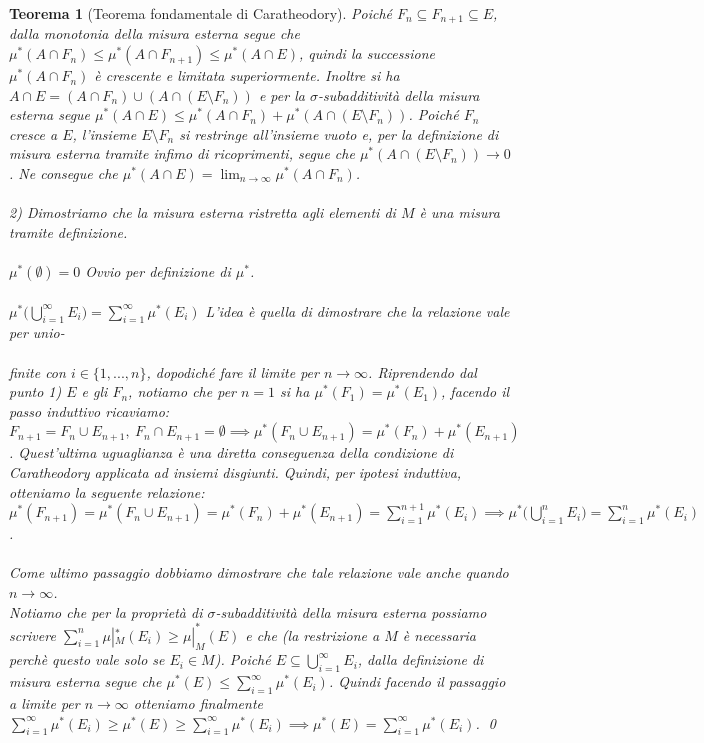 \documentclass[a4paper,12pt]{report}
\newtheorem{teorema}{Teorema}[chapter]
\begin{document}
\begin{teorema}[Teorema fondamentale di Caratheodory]
    Poiché $F_n \subseteq F_{n+1} \subseteq E$, dalla monotonia della misura esterna segue che $\mu^*(A \cap F_n) \leq \mu^*(A \cap F_{n+1}) \leq \mu^*(A \cap E)$, quindi la successione $\mu^*(A \cap F_n)$ è crescente e limitata superiormente. Inoltre si ha $A \cap E = (A \cap F_n) \cup (A \cap (E \setminus F_n))$ e per la $\sigma$-subadditività della misura esterna segue $\mu^*(A \cap E) \leq \mu^*(A \cap F_n) + \mu^*(A \cap (E \setminus F_n))$. Poiché $F_n$ cresce a $E$, l'insieme $E \setminus F_n$ si restringe all'insieme vuoto e, per la definizione di misura esterna tramite infimo di ricoprimenti, segue che $\mu^*(A \cap (E \setminus F_n)) \to 0$. Ne consegue che $\mu^*(A \cap E) = \lim_{n \to \infty} \mu^*(A \cap F_n)$.
    \\
    \\ 2) Dimostriamo che la misura esterna ristretta agli elementi di $M$ è una misura tramite definizione.
    \\
    \\ $\boxed{\mu^*(\emptyset)=0}$ Ovvio per definizione di $\mu^*$.
    \\
    \\ $\boxed{\mu^*\bigg(\displaystyle\bigcup_{i=1}^\infty E_i \bigg)=\sum_{i=1}^\infty \mu^*(E_i)}$ L'idea è quella di dimostrare che la relazione vale per unio-
    \\
    \\finite con $i \in \{1,...,n\}$, dopodiché fare il limite per $n \to \infty$. Riprendendo dal punto 1) $E$ e gli $F_n$, notiamo che per $n=1$ si ha $\mu^*(F_1)=\mu^*(E_1)$, facendo il passo induttivo ricaviamo: $F_{n+1}=F_n \cup E_{n+1}, \ F_n \cap E_{n+1}=\emptyset \implies \mu^*(F_n \cup E_{n+1})=\mu^*(F_n)+\mu^*(E_{n+1})$. Quest'ultima uguaglianza è una diretta conseguenza della condizione di Caratheodory applicata ad insiemi disgiunti. Quindi, per ipotesi induttiva, otteniamo la seguente relazione:
    \\ \mbox{$\mu^*(F_{n+1})=\mu^*(F_n \cup E_{n+1})=\mu^*(F_n)+\mu^*(E_{n+1})=\displaystyle \sum_{i=1}^{n+1}\mu^*(E_i)\implies \mu^*\bigg(\displaystyle\bigcup_{i=1}^n E_i \bigg)=\sum_{i=1}^n \mu^*(E_i)$.}
    \\
    \\ Come ultimo passaggio dobbiamo dimostrare che tale relazione vale anche quando $n\to \infty$.
    \\ Notiamo che per la proprietà di $\sigma$-subadditività della misura esterna possiamo scrivere $\displaystyle\sum_{i=1}^n\mu|_M^*(E_i)\geq \mu|_M^*(E)$ e che (la restrizione a $M$ è necessaria perchè questo vale solo se $E_i \in M$). Poiché $E \subseteq \bigcup_{i=1}^\infty E_i$, dalla definizione di misura esterna segue che $\mu^*(E) \le \sum_{i=1}^\infty \mu^*(E_i)$. Quindi facendo il passaggio a limite per $n\to \infty$ otteniamo finalmente $\displaystyle\sum_{i=1}^\infty \mu^*(E_i) \ge \mu^*(E) \ge \sum_{i=1}^\infty \mu^*(E_i)\implies \mu^*(E)=\sum_{i=1}^\infty\mu^*(E_i)$. \qed
\end{teorema}
\end{document}
